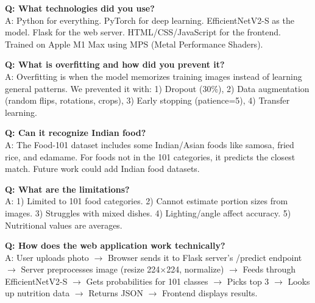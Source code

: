 \documentclass[11pt,a4paper]{article}
\begin{document}
\vspace{0.3cm}

\begin{qabox}
\textbf{Q: What technologies did you use?}\\[0.2cm]
A: Python for everything. PyTorch for deep learning. EfficientNetV2-S as the model. Flask for the web server. HTML/CSS/JavaScript for the frontend. Trained on Apple M1 Max using MPS (Metal Performance Shaders).
\end{qabox}

\vspace{0.3cm}

\begin{qabox}
\textbf{Q: What is overfitting and how did you prevent it?}\\[0.2cm]
A: Overfitting is when the model memorizes training images instead of learning general patterns. We prevented it with: 1) Dropout (30\%), 2) Data augmentation (random flips, rotations, crops), 3) Early stopping (patience=5), 4) Transfer learning.
\end{qabox}

\vspace{0.3cm}

\begin{qabox}
\textbf{Q: Can it recognize Indian food?}\\[0.2cm]
A: The Food-101 dataset includes some Indian/Asian foods like samosa, fried rice, and edamame. For foods not in the 101 categories, it predicts the closest match. Future work could add Indian food datasets.
\end{qabox}

\vspace{0.3cm}

\begin{qabox}
\textbf{Q: What are the limitations?}\\[0.2cm]
A: 1) Limited to 101 food categories. 2) Cannot estimate portion sizes from images. 3) Struggles with mixed dishes. 4) Lighting/angle affect accuracy. 5) Nutritional values are averages.
\end{qabox}

\vspace{0.3cm}

\begin{qabox}
\textbf{Q: How does the web application work technically?}\\[0.2cm]
A: User uploads photo $\rightarrow$ Browser sends it to Flask server's /predict endpoint $\rightarrow$ Server preprocesses image (resize 224$\times$224, normalize) $\rightarrow$ Feeds through EfficientNetV2-S $\rightarrow$ Gets probabilities for 101 classes $\rightarrow$ Picks top 3 $\rightarrow$ Looks up nutrition data $\rightarrow$ Returns JSON $\rightarrow$ Frontend displays results.
\end{qabox}
\end{document}
